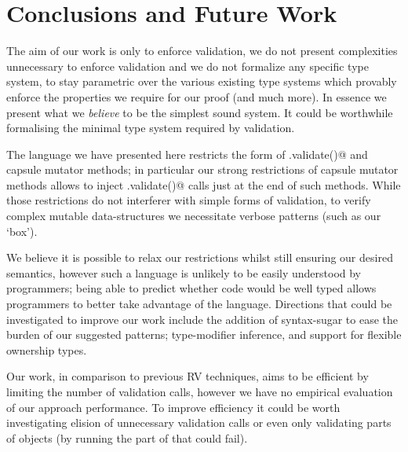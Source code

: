 \section{Conclusions and Future Work}
The aim of our work is only to enforce validation, we do not present complexities unnecessary to enforce validation and we do not formalize any specific type system, to stay parametric over 
the various existing type systems which provably enforce the properties we require for our proof (and much more).
In essence we present what we \emph{believe} to be the simplest sound system.
It could be worthwhile formalising the minimal type system required by validation.






The language we have presented here restricts the form of \Q@.validate()@
and capsule mutator methods; in particular
our strong restrictions of capsule mutator methods
allows to inject \Q@.validate()@ calls just at the end of such methods.
While those restrictions do not interferer with simple
forms of validation, to verify complex mutable data-structures we necessitate verbose patterns (such as our `box').

We believe it is possible to relax our restrictions whilst
still ensuring our desired semantics, however such a language is unlikely to be easily understood by programmers;
being able to predict whether code would be well typed allows programmers
to better take advantage of the language.
Directions that could be investigated to improve our work include the addition of syntax-sugar to ease the burden of our suggested patterns; type-modifier inference, and support for flexible ownership types.

Our work, in comparison to previous RV techniques, aims to be efficient by limiting the number of validation calls, however we have no empirical evaluation of our approach performance.
To improve efficiency it could be worth investigating elision of unnecessary validation calls
or even only validating parts of objects (by running the part of \Q@validate@ that could fail).